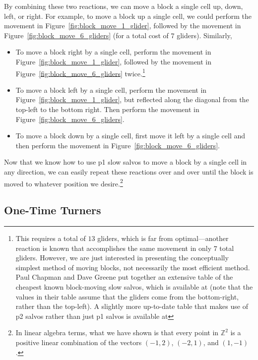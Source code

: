 By combining these two reactions, we can move a block a single cell up, down, left, or right. For example, to move a block up a single cell, we could perform the movement in Figure~\ref{fig:block_move_1_glider}, followed by the movement in Figure~\ref{fig:block_move_6_gliders} (for a total cost of $7$ gliders). Similarly,
\begin{itemize}
	\item To move a block right by a single cell, perform the movement in Figure~\ref{fig:block_move_1_glider}, followed by the movement in Figure~\ref{fig:block_move_6_gliders} twice.\footnote{This requires a total of $13$ gliders, which is far from optimal---another reaction is known that accomplishes the same movement in only $7$ total gliders. However, we are just interested in presenting the conceptually simplest method of moving blocks, not necessarily the most efficient method. Paul Chapman and Dave Greene put together an extensive table of the cheapest known block-moving slow salvos, which is available at  (note that the values in their table assume that the gliders come from the bottom-right, rather than the top-left). A slightly more up-to-date table that makes use of p2 salvos rather than just p1 salvos is available at }
	
	\item To move a block left by a single cell, perform the movement in Figure~\ref{fig:block_move_1_glider}, but reflected along the diagonal from the top-left to the bottom right. Then perform the movement in Figure~\ref{fig:block_move_6_gliders}.
	
	\item To move a block down by a single cell, first move it left by a single cell and then perform the movement in Figure~\ref{fig:block_move_6_gliders}.
\end{itemize}

Now that we know how to use p1 slow salvos to move a block by a single cell in any direction, we can easily repeat these reactions over and over until the block is moved to whatever position we desire.\footnote{In linear algebra terms, what we have shown is that every point in $\mathbb{Z}^2$ is a positive linear combination of the vectors $(-1,2)$, $(-2,1)$, and $(1,-1)$.}


\subsection{One-Time Turners}\label{sec:slow_salvo_turners}


